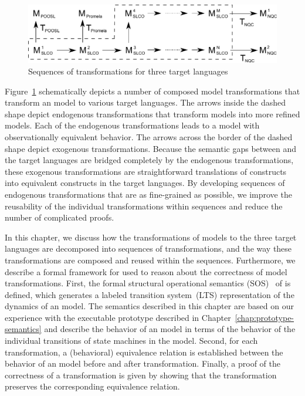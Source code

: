 \begin{figure}[hbt]
\centering
\includegraphics[width=.7\textwidth]{reusable-correct-transformations/figs/sequences}
\caption{Sequences of transformations for three target languages}
\label{fig:reusable-correct-transformations:sequences}
\end{figure}

Figure~\ref{fig:reusable-correct-transformations:sequences} schematically depicts a number of composed model transformations that transform an \SLCO model to various target languages.
The arrows inside the dashed shape depict endogenous transformations that transform \SLCO models into more refined \SLCO models.
Each of the endogenous transformations leads to a model with observationally equivalent behavior.
The arrows across the border of the dashed shape depict exogenous transformations.
Because the semantic gaps between \SLCO and the target languages are bridged completely by the endogenous transformations, these exogenous transformations are straightforward translations of \SLCO constructs into equivalent constructs in the target languages.
By developing sequences of endogenous transformations that are as fine-grained as possible, we improve the reusability of the individual transformations within sequences and reduce the number of complicated proofs.

In this chapter, we discuss how the transformations of \SLCO models to the three target languages are decomposed into sequences of transformations,
and the way these transformations are composed and reused within the sequences.
Furthermore, we describe a formal framework for \SLCO used to reason about the correctness of model transformations.
First, the formal structural operational semantics (SOS)~\cite{SOS2004Plotkin} of \SLCO is defined, which generates a labeled transition system~(LTS) representation of the dynamics of an \SLCO model.
The semantics described in this chapter are based on our experience with the executable prototype described in Chapter~\ref{chap:prototype-semantics} and describe the behavior of an \SLCO model in terms of the behavior of the individual transitions of state machines in the model.
Second, for each transformation, a (behavioral) equivalence relation is established between the behavior of an \SLCO model before and after transformation.
Finally, a proof of the correctness of a transformation is given by showing that the transformation preserves the corresponding equivalence relation.

